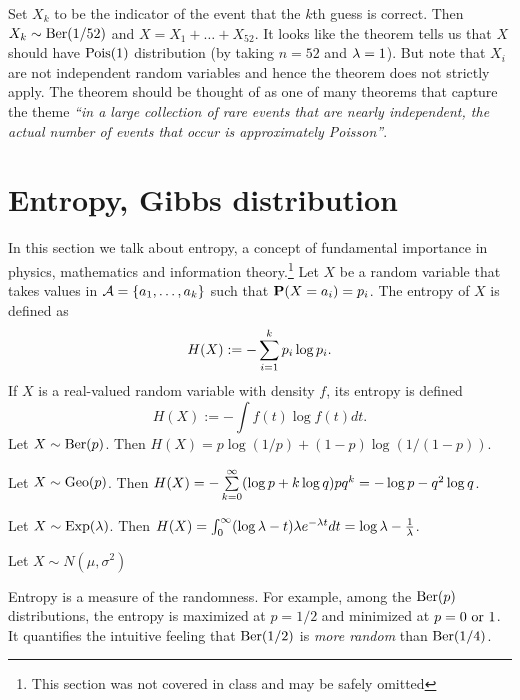 \documentclass[preprint,  11pt]{amsart}
\def\sig{{\sigma}}
\renewcommand{\benu}{\begin{enumerate}\setlength\itemsep{6pt}}
\begin{document}
Set $X_{k}$ to be the indicator of the event that the $k$th guess is correct. Then $X_{k}\sim \mb{Ber}(1/52)$ and $X=X_{1}+\ldots +X_{52}$. It looks like the theorem tells us that $X$ should have $\mb{Pois}(1)$ distribution (by taking $n=52$ and $\lam=1$). But note that $X_{i}$ are not independent random variables and hence the theorem does not strictly apply. The theorem should be thought of as one of many theorems that capture the theme {\em ``in a large collection of rare events that are nearly independent, the actual number of events that occur is approximately Poisson''}.


{\color{magenta}
\section{Entropy, Gibbs distribution}
In this section we talk about entropy, a concept of fundamental importance in physics, mathematics and information theory.\footnote{This section was not covered in class and may be safely omitted}
\bdefn Let $X$ be a random variable that takes values in $\AA=\{a_{1},\ldots ,a_{k}\}$ such that $\P(X=a_{i})=p_{i}$. The entropy of $X$ is defined as
$$
H(X) := -\summ_{i=1}^{k} p_{i}\log p_{i}.
$$
If $X$ is a real-valued random variable with density $f$, its entropy is defined
$$
H(X):= -\int f(t)\log f(t) dt.
$$
\edefn
\beg Let $X\sim\mb{Ber}(p)$. Then $H(X)=p\log(1/p) +(1-p)\log(1/(1-p))$.
\eeg

\beg Let $X\sim \mb{Geo}(p)$. Then $H(X)=-\summ_{k=0}^{\infty}(\log p+k\log q) pq^{k} = -\log p -q^{2}\log q$.
\eeg

\beg Let $X\sim \mb{Exp}(\lam)$. Then $H(X)=\int_{0}^{\infty} (\log \lam -t)\lam e^{-\lam t}dt=\log \lam -\frac{1}{\lam}$.
\eeg

\beg Let $X\sim N(\mu,\sig^{2})$
\eeg

Entropy is a measure of the randomness. For example, among the $\mb{Ber}(p)$ distributions, the entropy is maximized at $p=1/2$ and minimized at $p=0\mb{ or }1$. It quantifies the intuitive feeling that $\mb{Ber}(1/2)$ is {\em more random} than $\mb{Ber}(1/4)$.


}
\end{document}
